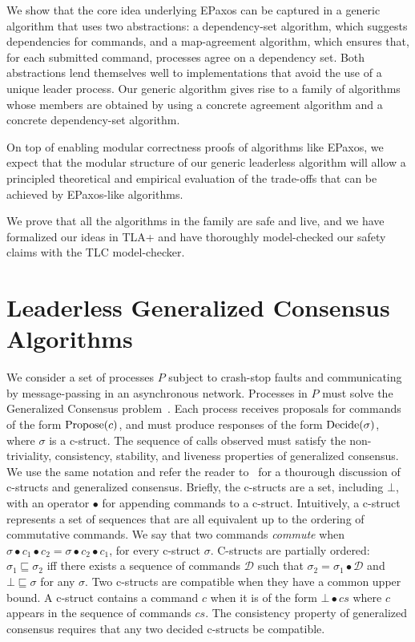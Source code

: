 We show that the core idea underlying EPaxos can be captured in a generic algorithm that uses two abstractions: a dependency-set algorithm, which suggests dependencies for commands, and a map-agreement algorithm, which ensures that, for each submitted command, processes agree on a dependency set. Both abstractions lend themselves well to implementations that avoid the use of a unique leader process.
Our generic algorithm gives rise to a family of algorithms whose members are obtained by using a concrete agreement algorithm and a concrete dependency-set algorithm. 

On top of enabling modular correctness proofs of algorithms like EPaxos, we expect that the modular structure of our generic leaderless algorithm will allow a principled theoretical and empirical evaluation of the trade-offs that can be achieved by EPaxos-like algorithms.

We prove that all the algorithms in the family are safe and live, and we have formalized our ideas in TLA+ and have thoroughly model-checked our safety claims with the TLC model-checker.

\section{Leaderless Generalized Consensus Algorithms}

We consider a set of processes $P$ subject to crash-stop faults and communicating by message-passing in an asynchronous network. Processes in $P$ must solve the Generalized Consensus problem~\cite{Lamport05GeneralizeConsensus}. Each process receives proposals for commands of the form $\operatorname{Propose}(c)$, and must produce responses of the form $\operatorname{Decide}(\sigma)$, where $\sigma$ is a c-struct. 
The sequence of calls observed must satisfy the non-triviality, consistency, stability, and liveness properties of generalized consensus.
We use the same notation and refer the reader to~\cite{Lamport05GeneralizeConsensus} for a thourough discussion of c-structs and generalized consensus. Briefly, the c-structs are a set, including $\bot$, with an operator $\bullet$ for appending commands to a c-struct. Intuitively, a c-struct represents a set of sequences that are all equivalent up to the ordering of commutative commands.
We say that two commands \textit{commute} when $\sigma\bullet c_1\bullet c_2 =  \sigma\bullet c_2\bullet c_1 $, for every c-struct $\sigma$.
C-structs are partially ordered: $\sigma_1\sqsubseteq \sigma_2$ iff there exists a sequence of commands $\mathcal{D}$ such that $\sigma_2 = \sigma_1\bullet \mathcal{D}$ and $\bot\sqsubseteq \sigma$ for any
$\sigma$. Two c-structs are compatible when they have a
common upper bound. A c-struct contains a command $c$ when it is of the form $\bot\bullet cs$ where $c$ appears in the sequence of commands $cs$. The consistency property of generalized consensus requires that any two decided c-structs be compatible.

